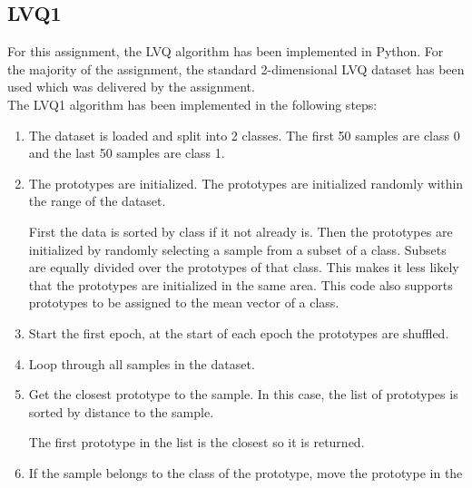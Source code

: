 \documentclass[twoside, a4paper, fleqn, reqno]{article}
\begin{document}
\subsection*{LVQ1}
	For this assignment, the LVQ algorithm has been implemented in Python.
	For the majority of the assignment, the standard 2-dimensional LVQ dataset has been
	used which was delivered by the assignment.\\
	The LVQ1 algorithm has been implemented in the following steps:
	\begin{enumerate}
		\item The dataset is loaded and split into 2 classes. The first 50 samples are
			class 0 and the last 50 samples are class 1.
			\begin{tabbing}
							
			\end{tabbing}
		\item The prototypes are initialized. The prototypes are initialized randomly
			within the range of the dataset.
			\begin{tabbing}
							
			\end{tabbing}
			First the data is sorted by class if it not already is. Then the prototypes are
			initialized by randomly selecting a sample from a subset of a class.
			Subsets are equally divided over the prototypes of that class. This makes it less
			likely that the prototypes are initialized in the same area. This code also supports
			prototypes to be assigned to the mean vector of a class.
		\item Start the first epoch, at the start of each epoch the prototypes are shuffled.
		\item Loop through all samples in the dataset.
		\item Get the closest prototype to the sample. In this case, the list of prototypes is
			sorted by distance to the sample.
			\begin{tabbing}
				
			\end{tabbing}
			The first prototype in the list is the closest so it is returned.
		\item If the sample belongs to the class of the prototype, move the prototype in the

\end{enumerate}
\end{document}
